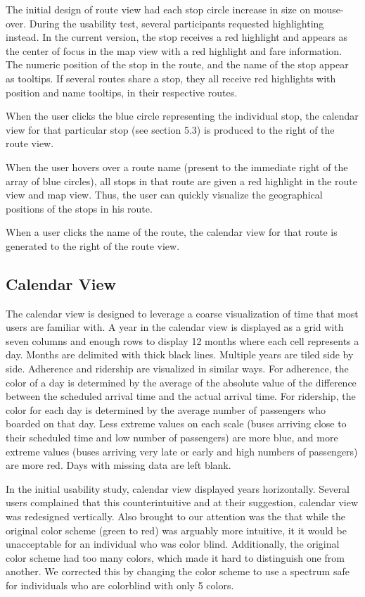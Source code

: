 \documentclass[journal]{vgtc}                %
\begin{document}
The initial design of route view had each stop circle increase in size on mouse-over. During the usability test, several participants requested highlighting instead. In the current version, the stop receives a red highlight and appears as the center of focus in the map view with a red highlight and fare information. The numeric position of the stop in the route, and the name of the stop appear as tooltips. If several routes share a stop,  they all receive red highlights with position and name tooltips, in their respective routes. 

When the user clicks the blue circle representing the individual stop, the calendar view for that particular stop (see section 5.3) is produced to the right of the route view. 

When the user hovers over a route name (present to the immediate right of the array of blue circles), all stops in that route are given a red highlight in the route view and map view. Thus, the user can quickly visualize the geographical positions of the stops in his route.

When a user clicks the name of the route, the calendar view for that route is generated to the right of the route view. 

\subsection{Calendar View}
The calendar view is designed to leverage a coarse visualization of time that most users are familiar with. A year in the calendar view is displayed as a grid with seven columns and enough rows to display 12 months where each cell represents a day. Months are delimited with thick black lines. Multiple years are tiled side by side.
Adherence and ridership are visualized in similar ways. For adherence, the color of a day is determined by the average of the absolute value of the difference between the scheduled arrival time and the actual arrival time. For ridership, the color for each day is determined by the average number of passengers who boarded on that day. Less extreme values on each scale (buses arriving close to their scheduled time and low number of passengers) are more blue, and more extreme values (buses arriving very late or early and high numbers of passengers) are more red. Days with missing data are left blank.

In the initial usability study, calendar view displayed years horizontally. Several users complained that this counterintuitive and at their suggestion, calendar view was redesigned vertically. Also brought to our attention was the that while the original color scheme (green to red) was arguably more intuitive, it it would be unacceptable for an individual who was color blind. Additionally, the original color scheme had too many colors, which made it hard to distinguish one from another. We corrected this by changing the color scheme to use a spectrum safe for individuals who are colorblind with only 5 colors.
\end{document}

